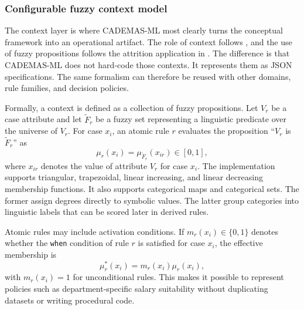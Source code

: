 \documentclass{interact}
\begin{document}
\subsubsection{Configurable fuzzy context model}

The context layer is where CADEMAS-ML most clearly turns the conceptual framework into an operational artifact. The role of context follows \citet{NovoaHernandez2026}, and the use of fuzzy propositions follows the attrition application in \citet{Godz2026}. The difference is that CADEMAS-ML does not hard-code those contexts. It represents them as JSON specifications. The same formalism can therefore be reused with other domains, rule families, and decision policies.

Formally, a context is defined as a collection of fuzzy propositions. Let $V_r$ be a case attribute and let $\tilde{F}_r$ be a fuzzy set representing a linguistic predicate over the universe of $V_r$. For case $x_i$, an atomic rule $r$ evaluates the proposition ``$V_r$ is $\tilde{F}_r$'' as
\begin{equation}
\mu_r(x_i)=\mu_{\tilde{F}_r}(x_{ir}) \in [0,1],
\label{eq:atomic_mu}
\end{equation}
where $x_{ir}$ denotes the value of attribute $V_r$ for case $x_i$. The implementation supports triangular, trapezoidal, linear increasing, and linear decreasing membership functions. It also supports categorical maps and categorical sets. The former assign degrees directly to symbolic values. The latter group categories into linguistic labels that can be scored later in derived rules.

Atomic rules may include activation conditions. If $m_r(x_i)\in\{0,1\}$ denotes whether the \texttt{when} condition of rule $r$ is satisfied for case $x_i$, the effective membership is
\begin{equation}
\mu_r^{*}(x_i)=m_r(x_i)\mu_r(x_i),
\label{eq:conditional_mu}
\end{equation}
with $m_r(x_i)=1$ for unconditional rules. This makes it possible to represent policies such as department-specific salary suitability without duplicating datasets or writing procedural code.
\end{document}
